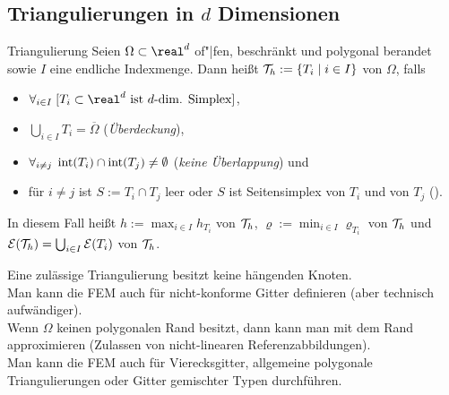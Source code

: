 \pagebreak

\subsection{%
    Triangulierungen in \texorpdfstring{$d$}{d} Dimensionen%
}

\begin{Def}{Triangulierung}
    Seien $\Omega \subset \real^d$ of"|fen, beschränkt und polygonal berandet sowie
    $I$ eine endliche Indexmenge.
    Dann heißt $\mathcal{T}_h := \{T_i \;|\; i \in I\}$ 
    von $\Omega$, falls
    \begin{itemize}
        \item
        $\forall_{i \in I}\; [\text{$T_i \subset \real^d$ ist $d$-dim. Simplex}]$,

        \item
        $\bigcup_{i \in I} T_i = \overline{\Omega}$
        (\emph{Überdeckung}),

        \item
        $\forall_{i \not= j}\; \operatorname{int}(T_i) \cap \operatorname{int}(T_j) \not= \emptyset$
        (\emph{keine Überlappung}) und

        \item
        für $i \not= j$ ist $S := T_i \cap T_j$
        leer oder $S$ ist Seitensimplex von $T_i$ und von $T_j$
        ().
    \end{itemize}
    In diesem Fall heißt
    $h := \max_{i \in I} h_{T_i}$  von $\mathcal{T}_h$,
    $\varrho := \min_{i \in I} \varrho_{T_i}$  von $\mathcal{T}_h$ und
    $\mathcal{E}(\mathcal{T}_h) = \bigcup_{i \in I} \mathcal{E}(T_i)$  von $\mathcal{T}_h$.
\end{Def}

\begin{Bem}
    Eine zulässige Triangulierung besitzt keine hängenden Knoten.\\
    Man kann die FEM auch für nicht-konforme Gitter definieren (aber technisch aufwändiger).\\
    Wenn $\Omega$ keinen polygonalen Rand besitzt, dann kann man mit
     dem Rand approximieren
    (Zulassen von nicht-linearen Referenzabbildungen).\\
    Man kann die FEM auch für Vierecksgitter, allgemeine polygonale Triangulierungen
    oder Gitter gemischter Typen durchführen.
\end{Bem}

